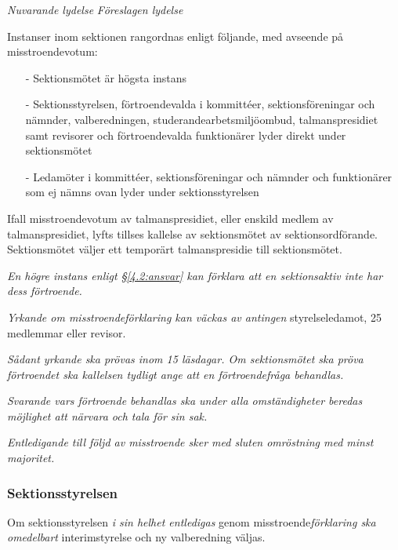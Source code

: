 \documentclass{article}
\newenvironment{lydelse}
    {\begin{paracol}{2}%
        \emph{Nuvarande lydelse}%
        \switchcolumn%
        \emph{Föreslagen lydelse}%
    \end{paracol}%
    \begin{enumerate}[label=\thesubsection.\arabic*]%
    \begin{paracol}{2}%
    }{\end{paracol}\end{enumerate}}
\begin{document}
\begin{lydelse}
	\item Instanser inom sektionen rangordnas enligt följande, med avseende på misstroendevotum:
  	  \begin{itemize}
  	    \item[-] Sektionsmötet är högsta instans
  		\item[-] Sektionsstyrelsen, förtroendevalda i kommittéer, sektionsföreningar och nämnder, valberedningen, studerandearbetsmiljöombud, talmanspresidiet samt revisorer och förtroendevalda funktionärer lyder direkt under sektionsmötet
  		\item[-] Ledamöter i kommittéer, sektionsföreningar och nämnder och funktionärer som ej nämns ovan lyder under sektionsstyrelsen
  	  \end{itemize}
	
  	\item Ifall misstroendevotum av talmanspresidiet, eller enskild medlem av talmanspresidiet, lyfts tillses kallelse av sektionsmötet av sektionsordförande. Sektionsmötet väljer ett temporärt talmanspresidie till sektionsmötet.

  \switchcolumn
    \setcounter{subsection}{4}  
    \item \emph{En högre instans enligt \S\ref{4.2:ansvar} kan förklara att en sektionsaktiv inte har dess förtroende.}

    \item \emph{Yrkande om misstroendeförklaring kan väckas av antingen} styrelseledamot, 25 medlemmar eller revisor.

    \item \emph{Sådant yrkande ska prövas inom 15 läsdagar.
    Om sektionsmötet ska pröva förtroendet ska kallelsen tydligt ange att en förtroendefråga behandlas.}

    \item \emph{Svarande vars förtroende behandlas ska under alla omständigheter beredas möjlighet att närvara och tala för sin sak.}

    \item \emph{Entledigande till följd av misstroende sker med sluten omröstning med minst  majoritet.}
      
    \subsubsection*{Sektionsstyrelsen}
    \item Om sektionsstyrelsen \emph{i sin helhet entledigas} genom misstroende\emph{förklaring ska omedelbart} interimstyrelse och ny valberedning väljas.


\end{lydelse}
\end{document}
